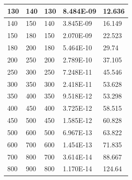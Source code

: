 \documentclass[a4paper, 12pt]{article}
\begin{document}
\begin{appendices}
\begin{table}[h!]
{\begin{tabular}{lllll}
		130                       & 140                       & 130                & 8.484E-09                                 & 12.636            \\ \hline
		140                       & 150                       & 140                & 3.845E-09                                 & 16.149            \\ \hline
		150                       & 180                       & 150                & 2.070E-09                                 & 22.523            \\ \hline
		180                       & 200                       & 180                & 5.464E-10                                 & 29.74             \\ \hline
		200                       & 250                       & 200                & 2.789E-10                                 & 37.105            \\ \hline
		250                       & 300                       & 250                & 7.248E-11                                 & 45.546            \\ \hline
		300                       & 350                       & 300                & 2.418E-11                                 & 53.628            \\ \hline
		350                       & 400                       & 350                & 9.518E-12                                 & 53.298            \\ \hline
		400                       & 450                       & 400                & 3.725E-12                                 & 58.515            \\ \hline
		450                       & 500                       & 450                & 1.585E-12                                 & 60.828            \\ \hline
		500                       & 600                       & 500                & 6.967E-13                                 & 63.822            \\ \hline
		600                       & 700                       & 600                & 1.454E-13                                 & 71.835            \\  \hline
		700                       & 800                       & 700                & 3.614E-14                                 & 88.667            \\ \hline
		800                       & 900                       & 800                & 1.170E-14                                 & 124.64            \\ \hline

\end{tabular}}
\end{table}
\end{appendices}
\end{document}

